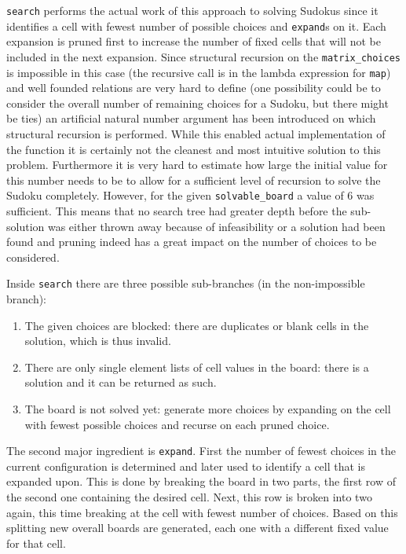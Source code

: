 \documentclass[a4paper,11pt]{article}
\begin{document}
\texttt{search} performs the actual work of this approach to solving Sudokus since it identifies a cell with fewest number of possible choices and \texttt{expand}s on it. Each expansion is pruned first to increase the number of fixed cells that will not be included in the next expansion. Since structural recursion on the \texttt{matrix\_choices} is impossible in this case (the recursive call is in the lambda expression for \texttt{map}) and well founded relations are very hard to define (one possibility could be to consider the overall number of remaining choices for a Sudoku, but there might be ties) an artificial natural number argument has been introduced on which structural recursion is performed. While this enabled actual implementation of the function it is certainly not the cleanest and most intuitive solution to this problem. Furthermore it is very hard to estimate how large the initial value for this number needs to be to allow for a sufficient level of recursion to solve the Sudoku completely. However, for the given \texttt{solvable\_board} a value of 6 was sufficient. This means that no search tree had greater depth before the sub-solution was either thrown away because of infeasibility or a solution had been found and pruning indeed has a great impact on the number of choices to be considered.

Inside \texttt{search} there are three possible sub-branches (in the non-impossible branch):
\begin{enumerate}
  \item The given choices are blocked: there are duplicates or blank cells in the solution, which is thus invalid.
  \item There are only single element lists of cell values in the board: there is a solution and it can be returned as such.
  \item The board is not solved yet: generate more choices by expanding on the cell with fewest possible choices and recurse on each pruned choice.
\end{enumerate}

The second major ingredient is \texttt{expand}. First the number of fewest choices in the current configuration is determined and later used to identify a cell that is expanded upon. This is done by breaking the board in two parts, the first row of the second one containing the desired cell. Next, this row is broken into two again, this time breaking at the cell with fewest number of choices. Based on this splitting new overall boards are generated, each one with a different fixed value for that cell.
\end{document}
